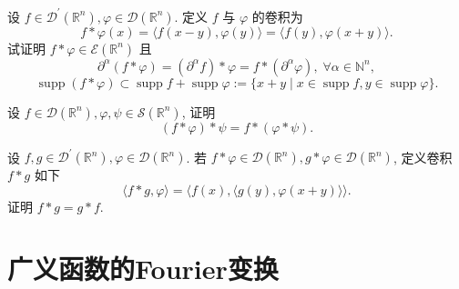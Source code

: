 \documentclass[lang=cn,newtx,10pt,scheme=chinese,thmcnt=chapter]{elegantbook}
\begin{document}
\begin{problemset}
  \item 设 \(f \in  {\mathcal{D}}^{\prime }\left( {\mathbb{R}}^{n}\right) ,\varphi  \in  \mathcal{D}\left( {\mathbb{R}}^{n}\right)\). 定义 \(f\) 与 \(\varphi\) 的卷积为
\begin{equation*}
  f * \varphi \left( x\right)  = \langle f\left( {x - y}\right) ,\varphi \left( y\right) \rangle  = \langle f\left( y\right) ,\varphi \left( {x + y}\right) \rangle. 
  \end{equation*}
  试证明 \(f * \varphi  \in  \mathcal{E}\left( {\mathbb{R}}^{n}\right)\) 且  \begin{equation*}
  {\partial }^{\alpha }\left( {f * \varphi }\right)  = \left( {{\partial }^{\alpha }f}\right)  * \varphi  = f * \left( {{\partial }^{\alpha }\varphi }\right),\;\forall \alpha  \in  {\mathbb{N}}^{n},
  \end{equation*}  \begin{equation*}
  \operatorname{supp}\left( {f * \varphi }\right)  \subset  \operatorname{supp}f + \operatorname{supp}\varphi  \mathrel{\text{ := }} \{ x + y \mid  x \in  \operatorname{supp}f,y \in  \operatorname{supp}\varphi \}.
  \end{equation*}

  \item 设 \(f \in  \mathcal{D}\left( {\mathbb{R}}^{n}\right) ,\varphi ,\psi  \in  \mathcal{S}\left( {\mathbb{R}}^{n}\right)\), 证明
  \begin{equation*}
  \left( {f * \varphi }\right)  * \psi  = f * \left( {\varphi  * \psi }\right).
  \end{equation*}

  \item 设 \(f,g \in  {\mathcal{D}}^{\prime }\left( {\mathbb{R}}^{n}\right) ,\varphi  \in  \mathcal{D}\left( {\mathbb{R}}^{n}\right)\). 若 \(f * \varphi  \in  \mathcal{D}\left( {\mathbb{R}}^{n}\right) ,g * \varphi  \in  \mathcal{D}\left( {\mathbb{R}}^{n}\right)\), 定义卷积 \(f * g\) 如下
  \begin{equation*}
  \langle f * g,\varphi \rangle  = \langle f\left( x\right) ,\langle g\left( y\right) ,\varphi \left( {x + y}\right) \rangle \rangle.
  \end{equation*}
  证明 \(f * g = g * f\).
\end{problemset}

\section{广义函数的Fourier变换}
\end{document}
